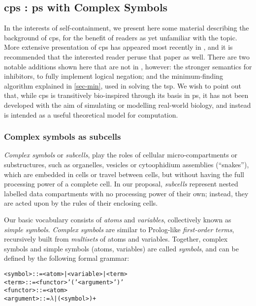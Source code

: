 \subsection{\label{sect:cpsystems}\texorpdfstring{\gls{cps}}{cP systems} : \texorpdfstring{\gls{ps}}{P systems} with Complex Symbols}

In the interests of self-containment, we present here some material describing the background of \gls{cps}, for the benefit of readers as yet unfamiliar with the topic.  More extensive presentation of \gls{cps} has appeared most recently in \cite{Nicolescu2018}, and it is recommended that the interested reader peruse that paper as well.  There are two notable additions shown here that are not in \cite{Nicolescu2018}, however: the stronger semantics for inhibitors, to fully implement logical negation; and the minimum-finding algorithm explained in \autoref{sec-min}, used in solving the \gls{tsp}.  We wish to point out that, while \gls{cps} is transitively bio-inspired through its basis in \gls{ps}, it has not been developed with the aim of simulating or modelling real-world biology, and instead is intended as a useful theoretical model for computation.

\subsubsection{Complex symbols as subcells}

\emph{Complex symbols} or \emph{subcells}, 
play the roles of cellular micro-compartments or substructures,
such as organelles, vesicles or cytoophidium assemblies (``snakes''),
which are embedded in cells or travel between cells, 
but without having the full processing power of a complete cell.
In our proposal, \emph{subcells} represent nested labelled data compartments
with no processing power of their own;
instead, they are acted upon by the rules of their enclosing cells.

Our basic vocabulary consists of \emph{atoms} and \emph{variables}, 
collectively known as \emph{simple symbols}.
\emph{Complex symbols} are similar to Prolog-like \emph{first-order terms}, 
recursively built from \emph{multisets} of atoms and variables.
Together, complex symbols and simple symbols (atoms, variables) are called \emph{symbols},
and can be defined by the following formal grammar:

\begin{framed}
\vspace{-0.5cm}
\begin{small}
\begin{alltt}
    <symbol> ::= <atom> | <variable> | <term> 
    <term> ::= <functor> '(' <argument> ')'
    <functor> ::= <atom>
    <argument> ::= \(\lambda\) | ( <symbol> )+
\end{alltt}
\end{small}
\vspace{-0.5cm}
\end{framed}


